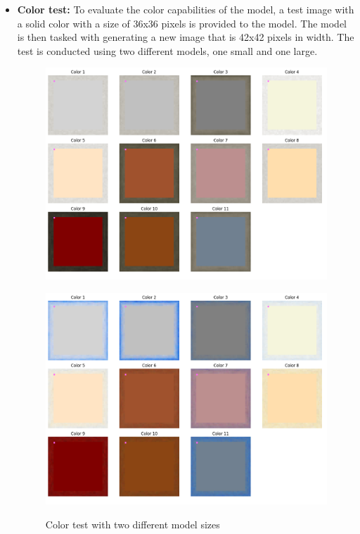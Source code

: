     \begin{itemize}
        \item \textbf{Color test:} To evaluate the color capabilities of the model, a test image with a solid color with a size of 36x36 pixels is provided to the model. The model is then tasked with generating a new image that is 42x42 pixels in width. The test is conducted using two different models, one small and one large.

        \begin{figure}[H]
            \centering
            \begin{minipage}{0.48\textwidth}
                \centering
                \includegraphics[width=\textwidth]{imgs/ColorTest_5.0.1.0_small.png} 
                \label{fig:test0_1_M4_SIT}
            \end{minipage}
            \hfill
            \begin{minipage}{0.48\textwidth}
                \centering
                \includegraphics[width=\textwidth]{imgs/ColorTest_5.0.1.0_big.png} 
                \label{fig:test0_2_M5_SIT}
            \end{minipage}
            \caption{Color test with two different model sizes}
        \end{figure}
        

\end{itemize}
